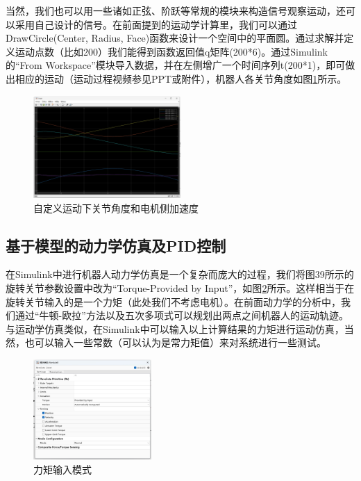 当然，我们也可以用一些诸如正弦、阶跃等常规的模块来构造信号观察运动，还可以采用自己设计的信号。在前面提到的运动学计算里，我们可以通过DrawCircle(Center, Radius, Face)函数来设计一个空间中的平面圆。通过求解并定义运动点数（比如200）我们能得到函数返回值q矩阵(200*6)。通过Simulink的“From Workspace”模块导入数据，并在左侧增广一个时间序列t(200*1)，即可做出相应的运动（运动过程视频参见PPT或附件），机器人各关节角度如图\ref{fig:26}所示。

\begin{figure}[htbp]
    \centering
    \includegraphics[width=0.5\textwidth]{Image/fig32.png}
    \caption{自定义运动下关节角度和电机侧加速度}
    \label{fig:26}
\end{figure}
\newpage
\subsection{基于模型的动力学仿真及PID控制}
在Simulink中进行机器人动力学仿真是一个复杂而庞大的过程，我们将图39所示的旋转关节参数设置中改为“Torque-Provided by Input”，如图\ref{fig:27}所示。这样相当于在旋转关节输入的是一个力矩（此处我们不考虑电机）。在前面动力学的分析中，我们通过“牛顿-欧拉”方法以及五次多项式可以规划出两点之间机器人的运动轨迹。与运动学仿真类似，在Simulink中可以输入以上计算结果的力矩进行运动仿真，当然，也可以输入一些常数（可以认为是常力矩值）来对系统进行一些测试。

\begin{figure}[htbp]
    \centering
    \includegraphics[width=0.4\textwidth]{Image/fig33.png}
    \caption{力矩输入模式}
    \label{fig:27}
\end{figure}

